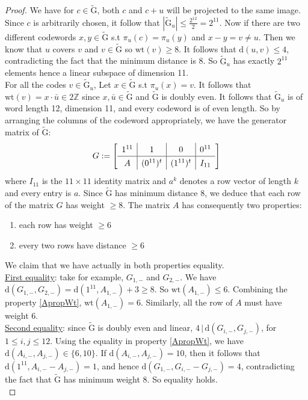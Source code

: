 \documentclass[12pt]{article}
\theoremstyle{definition}
\numberwithin{equation}{theorem}
\numberwithin{figure}{theorem}
\newcommand{\cCodes}{\ensuremath{\widetilde{\mathrm{G}}}}
\newcommand{\wt}[1]{\ensuremath{\text{wt}(#1)}}
\newcommand{\dist}[2]{\ensuremath{\text{d}(#1,#2)}}
\newcommand{\Integer}{\ensuremath{\mathbb{Z}}}
\begin{document}
\begin{proof}
We have for $c \in \cCodes$, both $c$ and $c + u$ will be projected to the same image. Since $c$ is arbitrarily chosen, it follow that $|\cCodes_u| \leq \frac{2^{12}}{2} = 2^{11}$. Now if there are two different codewords $x,y \in \cCodes$ s.t $\pi_{u}(c) = \pi_{u}(y)$ and $x - y = v \neq u$. Then we know that $u$ covers $v$ and $v \in \cCodes$ so $\wt{v} \geq 8$. It follows that $\dist{u}{v} \leq 4$, contradicting the fact that the minimum distance is 8. So $\cCodes_u$ has exactly $2^{11}$ elements hence a linear subspace of dimension 11.\\
For all the codes $v \in \cCodes_u$, Let $x \in \cCodes$ s.t $\pi_u(x) = v$. It follows that $\wt{v} = x \cdot \bar{u} \in 2\Integer$ since $x, \bar{u} \in \cCodes$ and $\cCodes$ is doubly even. It follows that $\cCodes_u$ is of word length 12, dimension 11, and every codeword is of even length.
So by arranging the columns of the codeword appropriately, we have the generator matrix of \cCodes:
\[
	G := 
\renewcommand\arraystretch{1.3}
\mleft[
\begin{array}{c|c|c|c}
  1^{11} & 1 & 0 & 0^{11} \\
  \hline
  A & (0^{11})^t & (1^{11})^t & I_{11}
\end{array}
\mright]
\]
where $I_{11}$ is the $11 \times 11$ identity matrix and $a^k$ denotes a row vector of length $k$ and every entry is $a$. Since {\cCodes} has minimum distance 8, we deduce that each row
of the matrix $G$ has weight $\geq 8$.
The matrix $A$ has consequently two properties:
\begin{enumerate}
	\item each row has weight $\geq 6$ \label{ApropWt}
	\item every two rows have distance $\geq 6$ \label{ArowDist}
\end{enumerate}
We claim that we have actually in both properties equality.\\
\underline{First equality}: take for example, $G_{1,-}$ and $G_{2,-}$. We have $\dist{G_{1,-}}{G_{2,-}} = \dist{1^{11}}{A_{1,-}} + 3 \geq 8$. So $\wt{A_{1,-}} \leq 6$. Combining the property \ref{ApropWt}, $\wt{A_{1,-}} = 6$. Similarly, all the row of $A$ must have weight 6.\\
\underline{Second equality}: since {\cCodes} is doubly even and linear, $4 \,|\, \dist{G_{i,-}}{G_{j,-}}$, for $1 \leq i,j \leq 12$. Using the equality in property \ref{ApropWt}, we have $\dist{A_{i,-}}{A_{j,-}} \in \{ 6, 10 \}$. If $\dist{A_{i,-}}{A_{j,-}} = 10$, then it follows that $\dist{1^{11}}{A_{i,-} - A_{j,-}} = 1$, and hence $\dist{G_{1,-}}{G_{i,-}- G_{j,-}} = 4$, contradicting the fact that {\cCodes} has minimum weight 8. So equality holds.\\

\end{proof}
\end{document}
